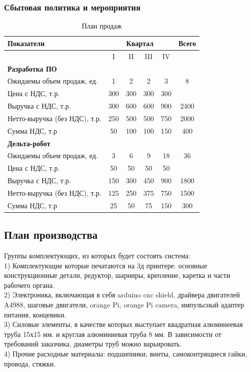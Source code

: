 \subsubsection{Сбытовая политика и мероприятия}
\begin{table}[h!]
    \centering
\begin{tabular}{|l|c|c|c|c|c|}
\hline
Показатели &\multicolumn{4}{|c|}{Квартал}   & Всего\\
\hline
           & I & II & III & IV & \\ 
\hline
\textbf{Разработка ПО}  & &  &  &  &  \\
\hline
Ожидаемы объем продаж, ед.  & 1  & 2  & 2  & 3  & 8  \\
\hline
Цена с НДС, т.р.  & 300  & 300  & 300  & 300  &  \\
\hline
Выручка с НДС, т.р.   & 300  & 600  & 600  & 900  & 2400 \\
\hline
Нетто-выручка (без НДС), т.р.  & 250   & 500  & 500  & 750  & 2000 \\
\hline
Сумма НДС, т.р   & 50  & 100 & 100  & 150  & 400 \\
\hline
\textbf{Дельта-робот}  & &  &  &  &  \\
\hline
Ожидаемы объем продаж, ед.  & 3 & 6  & 9  & 18  & 36  \\
\hline
Цена с НДС, т.р.  & 50  & 50  & 50  & 50  &  \\
\hline
Выручка с НДС, т.р.   & 150  & 300 & 450  & 900  & 1800 \\
\hline
Нетто-выручка (без НДС), т.р.  & 125  & 250  & 375  & 750  & 1500 \\
\hline
Сумма НДС, т.р   & 25   & 50  & 75  & 150  & 300 \\
\hline
\end{tabular}
\caption{План продаж}
\end{table}



\subsection{План производства}
                            
Группы комплектующих, из которых будет состоять система:\\
1) Комплектующие которые печатаются на 3д принтере: основные конструкционные детали, редуктор, шарниры, крепление, каретка и части рабочего органа.\\
2) Электроника, включающая в себя arduino cnc shield, драйвера двигателей A4988, шаговые двигатели, orange Pi, orange Pi camera, импульсный адаптер питания, концевики.\\
3) Силовые элементы, в качестве которых выступает квадратная алюминеевая труба 15х15 мм. и круглая алюминиевая труба 8 мм. В зависимости от требований заказчика, диаметры труб можно варьировать.\\
4) Прочие расходные материалы: подшипники, винты, самоконтрящиеся гайки, провода, стяжки.

